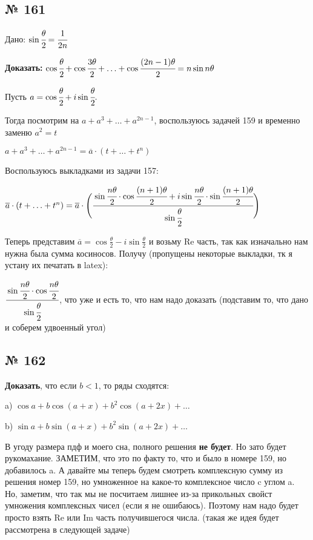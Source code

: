 \documentclass{article}
\begin{document}
\subsection{№ 161}

Дано: $\sin \cfrac{\theta}{2}=\cfrac{1}{2n}$

\textbf{Доказать:} $\cos \cfrac{\theta}{2} + \cos \cfrac{3\theta}{2} + \ldots + \cos\cfrac{(2n-1) \theta}{2} = n \sin n\theta$ 

Пусть $a = \cos \cfrac{\theta}{2} + i \sin \cfrac{\theta}{2}.$

Тогда посмотрим на $a + a^3 + \ldots +a^{2n-1}$, воспользуюсь задачей 159 и временно заменю $a^2=t$

$a + a^3 + \ldots +a^{2n-1} = \overline{a} \cdot(t+\ldots +t^{n})$

Воспользуюсь выкладками из задачи 157:

$\overline{a} \cdot(t+\ldots +t^{n})=\overline{a}\cdot  \Bigg(\cfrac{\sin \cfrac{n \theta}{2}\cdot \cos \cfrac{(n+1)\theta}{2}+ i \sin \cfrac{n \theta}{2}\cdot \sin \cfrac{(n+1) \theta}{2}}{\sin \cfrac{\theta}{2}}\Bigg)$

Теперь представим $\overline{a} = \cos\frac{\theta}{2} - i\sin\frac{\theta}{2} $ и возьму Re часть, так как изначально нам нужна была сумма косиносов. Получу (пропущены некоторые выкладки, тк я устану их печатать в latex):

$\cfrac{\sin \cfrac{n \theta}{2} \cdot \cos \cfrac{n \theta}{2}}{\sin\cfrac{\theta}{2}}$, что уже и есть то, что нам надо доказать (подставим то, что дано и соберем удвоенный угол)
\pagebreak
\subsection{№ 162}

\textbf{Доказать}, что если $b<1$, то ряды сходятся:

a) $\cos a + b\cos (a+x)+b^2\cos (a+2x)+\ldots$

b) $\sin a + b\sin (a+x)+b^2\sin (a+2x)+\ldots$

В угоду размера пдф и моего сна, полного решения \textbf{не будет}. Но зато будет  рукомахание. ЗАМЕТИМ, что это по факту то, что и было  в номере 159, но добавилось a. А давайте мы теперь будем смотреть комплексную сумму из решения номер 159, но умноженное на какое-то комплексное число c углом a. Но, заметим, что так мы не посчитаем лишнее из-за прикольных свойст умножения комплексных чисел (если я не ошибаюсь). Поэтому нам надо будет просто взять Re или Im часть получившегося числа. (такая же идея будет рассмотрена в следующей задаче)
\pagebreak
\end{document}
